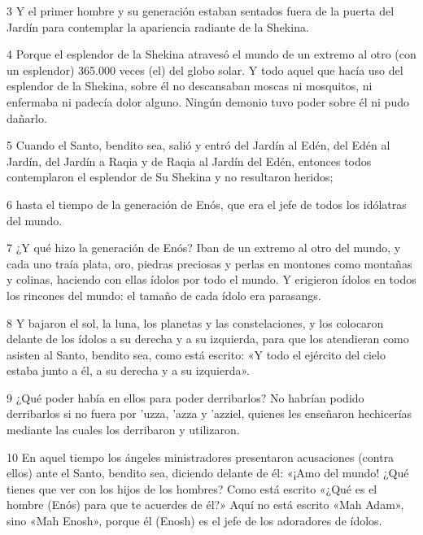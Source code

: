 \par 3 Y el primer hombre y su generación estaban sentados fuera de la puerta del Jardín para contemplar la apariencia radiante de la Shekina.

\par 4 Porque el esplendor de la Shekina atravesó el mundo de un extremo al otro (con un esplendor) 365.000 veces (el) del globo solar. Y todo aquel que hacía uso del esplendor de la Shekina, sobre él no descansaban moscas ni mosquitos, ni enfermaba ni padecía dolor alguno. Ningún demonio tuvo poder sobre él ni pudo dañarlo.

\par 5 Cuando el Santo, bendito sea, salió y entró del Jardín al Edén, del Edén al Jardín, del Jardín a Raqia y de Raqia al Jardín del Edén, entonces todos contemplaron el esplendor de Su Shekina y no resultaron heridos;

\par 6 hasta el tiempo de la generación de Enós, que era el jefe de todos los idólatras del mundo.

\par 7 ¿Y qué hizo la generación de Enós? Iban de un extremo al otro del mundo, y cada uno traía plata, oro, piedras preciosas y perlas en montones como montañas y colinas, haciendo con ellas ídolos por todo el mundo. Y erigieron ídolos en todos los rincones del mundo: el tamaño de cada ídolo era parasangs.

\par 8 Y bajaron el sol, la luna, los planetas y las constelaciones, y los colocaron delante de los ídolos a su derecha y a su izquierda, para que los atendieran como asisten al Santo, bendito sea, como está escrito: «Y todo el ejército del cielo estaba junto a él, a su derecha y a su izquierda».

\par 9 ¿Qué poder había en ellos para poder derribarlos? No habrían podido derribarlos si no fuera por 'uzza, 'azza y 'azziel, quienes les enseñaron hechicerías mediante las cuales los derribaron y utilizaron.

\par 10 En aquel tiempo los ángeles ministradores presentaron acusaciones (contra ellos) ante el Santo, bendito sea, diciendo delante de él: «¡Amo del mundo! ¿Qué tienes que ver con los hijos de los hombres? Como está escrito «¿Qué es el hombre (Enós) para que te acuerdes de él?» Aquí no está escrito «Mah Adam», sino «Mah Enosh», porque él (Enosh) es el jefe de los adoradores de ídolos.

